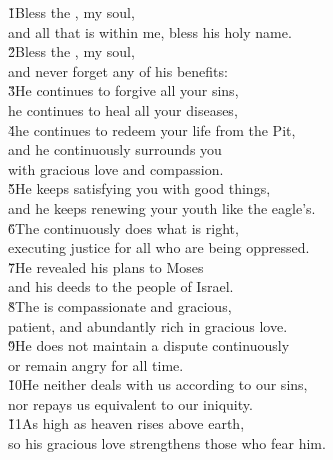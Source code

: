 \begin{poetry}
\poeml \v{1}Bless the , my soul, \\
\poemll    and all that is within me, bless his holy name. \\
\poeml \v{2}Bless the , my soul, \\
\poemll    and never forget any of his benefits: \\
\poeml \v{3}He continues to forgive all your sins, \\
\poemll    he continues to heal all your diseases, \\
\poeml \v{4}he continues to redeem your life from the Pit, \\
\poemll    and he continuously surrounds you \\
\poemlll       with gracious love and compassion. \\
\poeml \v{5}He keeps satisfying you with good things, \\
\poemll    and he keeps renewing your youth like the eagle's. \\
\poeml \v{6}The  continuously does what is right, \\
\poemll    executing justice for all who are being oppressed. \\
\poeml \v{7}He revealed his plans to Moses \\
\poemll    and his deeds to the people of Israel. \\
\poeml \v{8}The  is compassionate and gracious, \\
\poemll    patient, and abundantly rich in gracious love. \\
\poeml \v{9}He does not maintain a dispute continuously \\
\poemll    or remain angry for all time. \\
\poeml \v{10}He neither deals with us according to our sins, \\
\poemll    nor repays us equivalent to our iniquity. \\
\poeml \v{11}As high as heaven rises above earth, \\
\poemll    so his gracious love strengthens those who fear him. \\

\end{poetry}

